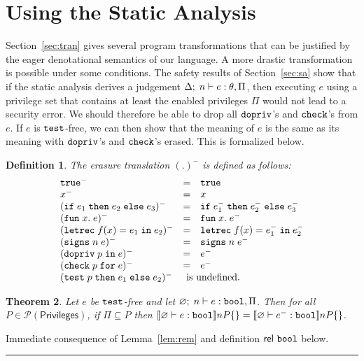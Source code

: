 \documentclass[submission,copyright,creativecommons]{eptcs}
\newcommand{\blackslug}{\rule{7pt}{7pt}}
\newcommand{\ifthenelse}[3]{\IF\;#1\;\THEN\;#2\;\ELSE\;#3}
\newcommand{\enable}[2]{\ENABLE\;#1\;\IN\;#2}
\newcommand{\chk}[2]{\CHK\;#1\;\FOR\;#2}
\newcommand{\test}[3]{\TEST\;#1\;\THEN\;#2\;\ELSE\;#3}
\newcommand{\signs}[2]{\SIGNS\;#1\;#2}
\newcommand{\BOOL}{\mbox{\texttt{bool}}}
\newcommand{\ELSE}{\mbox{\texttt{else}}}
\newcommand{\IF}{\mbox{\texttt{if}}}
\newcommand{\FOR}{\mbox{\texttt{for}}}
\newcommand{\IN}{\mbox{\texttt{in}}}
\newcommand{\LET}{\mbox{\texttt{let}}}
\newcommand{\REC}{{\texttt{rec}}}
\newcommand{\THEN}{{\texttt{then}}}
\newcommand{\TRUE}{{\texttt{true}}}
\renewcommand{\P}{\mathcal{P}}
\newcommand{\ldb}{[\![}
\newcommand{\rdb}{]\!]}
\newcommand{\means}[1]{\ldb {#1}\rdb}
\newcommand{\proves}{\vdash}
\newcommand{\Empty}{\varnothing}
\newcommand{\recdecl}[3]{\REC\;#1(#2) = #3}
\newcommand{\PRIV}{{\mathsf{Privileges}}}
\newcommand{\ENABLE}{\mbox{\texttt{dopriv}}}
\newcommand{\CHK}{\mbox{\texttt{check}}}
\newcommand{\TEST}{\mbox{\texttt{test}}}
\newcommand{\SIGNS}{\mbox{\texttt{signs}}}
\newcommand{\Rel}{\textsf{rel}}
\newcommand{\letdecl}[2]{\LET#1\;\IN\;#2}
\newcommand{\LAM}[2]{{\mathtt{fun}\; #1.\; #2}}
\newcommand{\n}{n} \newcommand{\p}{p} \newcommand{\Ps}{\Pi} \newcommand{\h}{h}
\newtheorem{theorem}{Theorem}[section]
\newtheorem{definition}[theorem]{Definition}
\newenvironment{proof}{\begin{trivlist}\item[\hskip\labelsep{\bf
Proof:}]}{\blackslug\end{trivlist}}
\begin{document}
\section{Using the Static Analysis}
\label{sec:use}
Section~\ref{sec:tran} gives several program transformations that can
be justified by the eager denotational semantics of our language. 
A more drastic transformation is possible under some conditions.
The safety results of Section~\ref{sec:sa}
show that if the static analysis derives a judgement 
$\Delta;\;\n\proves e:\th,\Pi$, then executing $e$ using a privilege set
that contains at least the enabled privileges $\Pi$ would not lead to a
security error. We should therefore be able to drop all $\ENABLE$'s and 
$\CHK$'s from $e$. If $e$ is $\TEST$-free, we can then show that 
the meaning of $e$ is the same as its meaning with $\ENABLE$'s and $\CHK$'s
erased. This is formalized below.
\begin{definition}
The erasure translation $(.)^-$ is defined as follows:
\[
\begin{array}{lcl}
\TRUE^- &=& \TRUE\\
x^-&=& x\\
(\ifthenelse{e_1}{e_2}{e_3})^- &=& \ifthenelse{e_1^-}{e_2^-}{e_3^-}\\
(\LAM{x}{e})^- &=& \LAM{x}{e^-} \\
(\letdecl{\recdecl{f}{x}{e_1}}{e_2})^- &=&
\letdecl{\recdecl{f}{x}{e_1^-}}{e_2^-}\\
(\signs{\n}{e})^- &=& \signs{\n}{e^-}\\
(\enable{\p}{e})^-&=& e^-\\
(\chk{\p}{e})^- &=& e^-\\
(\test{\p}{e_1}{e_2})^- & 
\multicolumn{2}{l}{\mbox{ is undefined}.}
\end{array}
\]
\end{definition}
\begin{theorem}\label{thm:erase}
Let $e$ be $\TEST$-free and let $\Empty;\;\n\proves e:\BOOL,\Ps$. Then for
all $P\in\P(\PRIV)$, if $\Ps\subseteq P$ then
$\means{\Empty\proves e:\BOOL}\n P\{\} = 
\means{\Empty\proves e^-:\BOOL}\n P\{\}$.
\end{theorem}
\begin{proof}
Immediate consequence of Lemma~\ref{lem:rem} and definition $\Rel~\BOOL$ below.
\end{proof}
\end{document}

